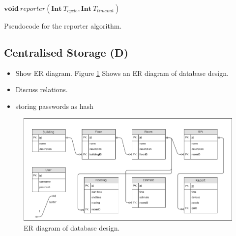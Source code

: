 \documentclass{l4proj}
\begin{document}
\begin{algorithm}
\DontPrintSemicolon
\nl $\textbf{void}~reporter(\textbf{Int}~T_{cycle}, \textbf{Int}~T_{timeout})$ \;
\nl {}
\;
\caption{Pseudocode for the reporter algorithm.}
\label{RPA}
\end{algorithm}





\subsection{Centralised Storage (D)}
\begin{itemize}	
  \item Show ER diagram.
Figure \ref{fig:ERdiagram} Shows an ER diagram of database design.

  \item Discuss relations.
  \item storing passwords as hash
\end{itemize}
\begin{figure}
\centering
\includegraphics[width=\textwidth]{ERdiagram}
\caption{ER diagram of database design.}
\label{fig:ERdiagram}
\end{figure}
\end{document}
